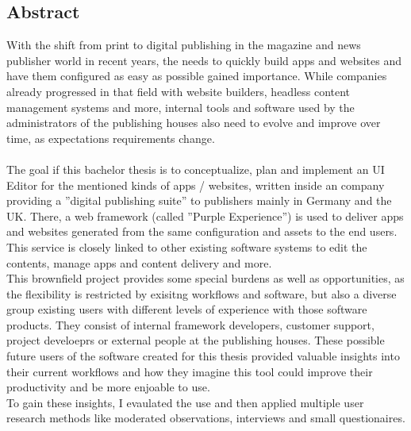 %
\pagestyle{empty}

\subsection*{Abstract}

With the shift from print to digital publishing in the magazine and news publisher world in recent years, the needs to quickly build apps and websites and have them configured as easy as possible gained importance.
While companies already progressed in that field with website builders, headless content management systems and more, internal tools and software used by the administrators of the publishing houses also need to evolve and improve over time, as expectations requirements change.
\\\\
The goal if this bachelor thesis is to conceptualize, plan and implement an UI Editor for the mentioned kinds of apps / websites, written inside an company providing a ''digital publishing suite'' to publishers mainly in Germany and the UK.
There, a web framework (called ''Purple Experience'') is used to deliver apps and websites generated from the same configuration and assets to the end users. This service is closely linked to other existing software systems to edit the contents, manage apps and content delivery and more.
\\
This brownfield project provides some special burdens as well as opportunities,
as the flexibility is restricted by exisitng workflows and software, but also a diverse group existing users with different levels of experience with those software products.
They consist of internal framework developers, customer support, project develoeprs or external people at the publishing houses.
These possible future users of the software created for this thesis provided valuable insights
into their current workflows and how they imagine this tool could improve their productivity and be more enjoable to use.
\\
To gain these insights, I evaulated the use and then applied multiple user research methods like moderated observations, interviews and small questionaires.
